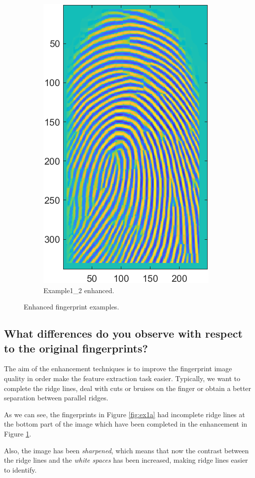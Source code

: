 \documentclass[a4paper]{article}
\begin{document}
\begin{figure}[h!]
\begin{subfigure}[t]{0.45\textwidth}
         \includegraphics[scale=0.8]{Figures/Enhanced2}
         \caption{Example1\_2 enhanced.}
     \end{subfigure}
    \caption{Enhanced fingerprint examples.}
    \label{fig:ex2a}
\end{figure}


\subsection{ What differences do you observe with respect to the original fingerprints?}

The aim of the enhancement techniques is to improve the fingerprint image quality in order make the feature extraction task easier. Typically, we want to complete the ridge lines, deal with cuts or bruises on the finger or obtain a better separation between parallel ridges.

As we can see, the fingerprints in Figure \ref{fig:ex1a} had incomplete ridge lines at the bottom part of the image which have been completed in the enhancement in Figure \ref{fig:ex2a}.

Also, the image has been \emph{sharpened}, which means that now the contrast between the ridge lines and the \emph{white spaces} has been increased, making ridge lines easier to identify.
\end{document}
